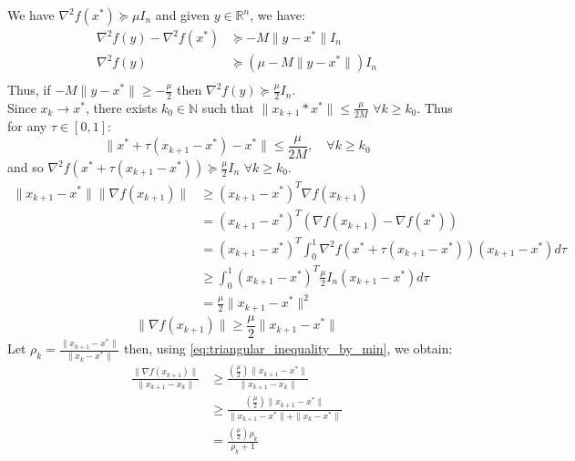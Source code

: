 \documentclass[12pt, openany]{report}
\newcommand{\R}{\mathbb{R}}
\newcommand{\N}{\mathbb{N}}
\theoremstyle{definition}
\begin{document}
We have $\nabla^2 f(x^*) \succeq \mu I_n$ and given $y \in \R^n$, we have:
\begin{equation}
	\begin{aligned}
		\nabla^2f(y)-\nabla^2f(x^*) &\succeq - M \|y-x^*\| I_n\\
		\nabla^2f(y) &\succeq (\mu - M \|y-x^*\|) I_n\\
	\end{aligned}
\end{equation}
Thus, if $-M \|y-x^*\| \geq - \frac{\mu}{2}$ then $\nabla^2f(y) \succeq \frac{\mu}{2} I_n$.\\
Since $x_k \to x^*$, there exists $k_0 \in \N$ such that $\|x_{k+1}*x^*\| \leq \frac{\mu}{2M}$ $\forall k \geq k_0$. Thus for any $\tau \in [0,1]$:
\begin{equation}
	\|x^*+\tau(x_{k+1}-x^*)-x^*\| \leq \frac{\mu}{2M}, \quad \forall k \geq k_0
\end{equation}
and so $\nabla^2f(x^*+\tau(x_{k+1}-x^*)) \succeq \frac{\mu}{2} I_n$ $\forall k \geq k_0$.
\begin{equation}
	\begin{aligned}
		\|x_{k+1}-x^*\|\|\nabla f(x_{k+1})\| &\geq (x_{k+1}-x^*)^T\nabla f(x_{k+1})\\
		&= (x_{k+1}-x^*)^T \left( \nabla f(x_{k+1}) - \nabla f(x^*)\right)\\
		&= (x_{k+1}-x^*)^T \int_{0}^{1} \nabla^2 f(x^*+\tau(x_{k+1}-x^*)) (x_{k+1}-x^*) d\tau\\
		&\geq \int_{0}^{1} (x_{k+1}-x^*)^T \frac{\mu}{2} I_n (x_{k+1}-x^*) d\tau\\
		&= \frac{\mu}{2} \|x_{k+1}-x^*\|^2
	\end{aligned}
\end{equation}
\begin{equation}\label{eq:bound_norm_hessian}
	\|\nabla f(x_{k+1})\| \geq \frac{\mu}{2} \|x_{k+1}-x^*\|
\end{equation}
Let $\rho_k = \frac{\|x_{k+1}-x^*\|}{\|x_k-x^*\|}$ then, using \eqref{eq:triangular_inequality_by_min}, we obtain:
\begin{equation}\label{eq:bound_rho_k}
	\begin{aligned}
		\frac{\|\nabla f(x_{k+1})\|}{\|x_{k+1}-x_k\|} &\geq \frac{(\frac{\mu}{2})\|x_{k+1}-x^*\|}{\|x_{k+1}-x_k\|}\\
		&\geq \frac{(\frac{\mu}{2})\|x_{k+1}-x^*\|}{\|x_{k+1}-x^*\| + \|x_k-x^*\|}\\
		&= \frac{(\frac{\mu}{2}) \rho_k}{\rho_k + 1}
	\end{aligned}
\end{equation}
\end{document}
